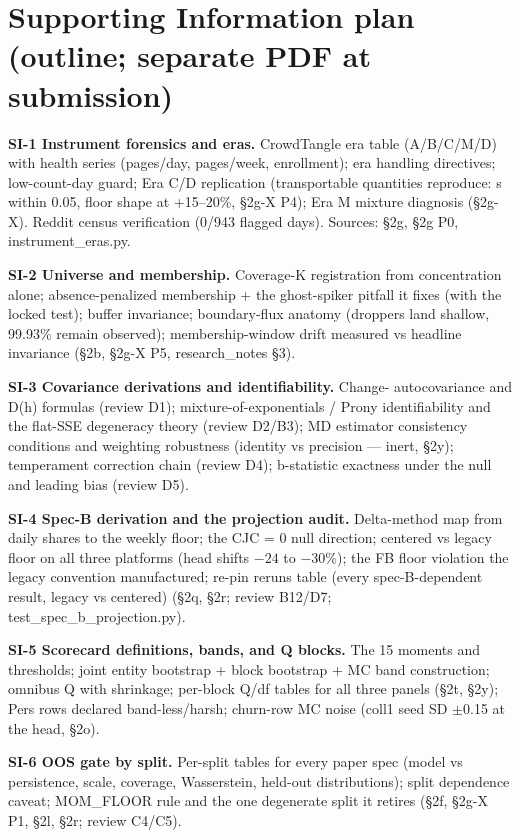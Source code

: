 \documentclass[9pt,twocolumn,twoside]{pnas-new}
\begin{document}
\section*{Supporting Information plan (outline; separate PDF at submission)}
{\footnotesize\sffamily

\textbf{SI-1 Instrument forensics and eras.} CrowdTangle era table
(A/B/C/M/D) with health series (pages/day, pages/week, enrollment); era
handling directives; low-count-day guard; Era C/D replication (transportable
quantities reproduce: s within 0.05, floor shape at +15--20\%, \S2g-X P4);
Era M mixture diagnosis (\S2g-X). Reddit census verification (0/943 flagged
days). Sources: \S2g, \S2g P0, instrument\_eras.py.

\textbf{SI-2 Universe and membership.} Coverage-K registration from
concentration alone; absence-penalized membership + the ghost-spiker
pitfall it fixes (with the locked test); buffer invariance; boundary-flux
anatomy (droppers land shallow, 99.93\% remain observed); membership-window
drift measured vs headline invariance (\S2b, \S2g-X P5, research\_notes
\S3).

\textbf{SI-3 Covariance derivations and identifiability.} Change-
autocovariance and D(h) formulas (review D1); mixture-of-exponentials /
Prony identifiability and the flat-SSE degeneracy theory (review D2/B3);
MD estimator consistency conditions and weighting robustness (identity vs
precision — inert, \S2y); temperament correction chain (review D4);
b-statistic exactness under the null and leading bias (review D5).

\textbf{SI-4 Spec-B derivation and the projection audit.} Delta-method map
from daily shares to the weekly floor; the CJC = 0 null direction; centered
vs legacy floor on all three platforms (head shifts $-24$ to $-30\%$); the
FB floor violation the legacy convention manufactured; re-pin reruns table
(every spec-B-dependent result, legacy vs centered) (\S2q, \S2r; review
B12/D7; test\_spec\_b\_projection.py).

\textbf{SI-5 Scorecard definitions, bands, and Q blocks.} The 15 moments
and thresholds; joint entity bootstrap + block bootstrap + MC band
construction; omnibus Q with shrinkage; per-block Q/df tables for all three
panels (\S2t, \S2y); Pers rows declared band-less/harsh; churn-row MC noise
(coll1 seed SD $\pm$0.15 at the head, \S2o).

\textbf{SI-6 OOS gate by split.} Per-split tables for every paper spec
(model vs persistence, scale, coverage, Wasserstein, held-out
distributions); split dependence caveat; MOM\_FLOOR rule and the one
degenerate split it retires (\S2f, \S2g-X P1, \S2l, \S2r; review C4/C5).

}
\end{document}
